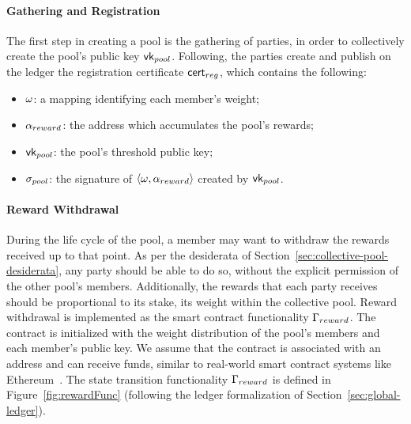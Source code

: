 \paragraph{Gathering and Registration}
The first step in creating a pool is the gathering of parties, in order to
collectively create the pool's public key $\mathsf{vk}_{pool}$. Following,
the parties create and publish on the ledger the registration certificate
$\mathsf{cert}_{reg}$, which contains the following:
\begin{itemize}[noitemsep]
    \item $\omega$: a mapping identifying each member's weight;
    \item $\alpha_{reward}$: the address which accumulates the pool's rewards;
    \item $\mathsf{vk}_{pool}$: the pool's threshold public key;
    \item $\sigma_{pool}$: the signature of $\langle \omega, \alpha_{reward}
        \rangle$ created by $\mathsf{vk}_{pool}$.
\end{itemize}

\paragraph{Reward Withdrawal}
During the life cycle of the pool, a member may want to withdraw the rewards
received up to that point. As per the desiderata of
Section~\ref{sec:collective-pool-desiderata}, any party should be able to do so, without the
explicit permission of the other pool's members. Additionally, the rewards that
each party receives should be proportional to its stake, \ie its weight within
the collective pool. Reward withdrawal is implemented as the smart contract
functionality $\Gamma_{reward}$. The contract is initialized with the weight
distribution of the pool's members and each member's public key. We assume that
the contract is associated with an address and can receive funds,
similar to real-world smart contract systems like
Ethereum~\cite{wood2014ethereum}. The state transition functionality
$\Gamma_{reward}$ is defined in Figure~\ref{fig:rewardFunc} (following the ledger
formalization of Section~\ref{sec:global-ledger}).


